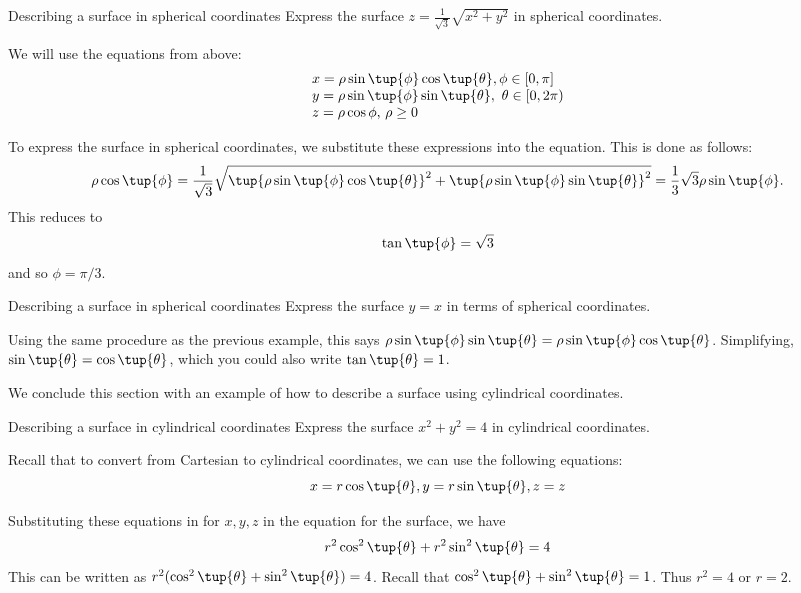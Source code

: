 \begin{example}{Describing a surface in spherical coordinates}{}
Express the surface $z=\frac{1}{\sqrt{3}}\sqrt{x^{2}+y^{2}}$ in spherical
coordinates.
\end{example}

\begin{solution}
We will use the equations from above:
\[
\begin{array}{l}
x =\rho \sin \tup{\phi } \cos \tup{\theta }, \phi \in 
\left[ 0,\pi \right]\\
 y =\rho \sin \tup{\phi } \sin \tup{\theta } ,\text{ }\theta
\in \lbrack 0,2\pi ) \\
 z =\rho \cos \phi \text{, }\rho \geq 0
\end{array}
\]

To express the surface in spherical coordinates, we substitute these expressions into the equation.  
This is done as follows:
\begin{equation*}
\rho \cos \tup{\phi } =\frac{1}{\sqrt{3}}\sqrt{\tup{\rho \sin
\tup{\phi } \cos \tup{\theta } } ^{2}+\tup{\rho \sin
\tup{\phi } \sin \tup{\theta } } ^{2}}=\allowbreak 
\frac{1}{3}\sqrt{3}\rho \sin \tup{\phi }.
\end{equation*}
This reduces to 
\begin{equation*}
\tan \tup{\phi }=\sqrt{3}
\end{equation*}
and so $\phi =\pi /3$.
\end{solution}

\begin{example}{Describing a surface in spherical coordinates}{}
Express the surface $y=x$ in terms of spherical coordinates.
\end{example}

\begin{solution}
Using the same procedure as the previous example, this says $\allowbreak \rho \sin \tup{\phi } \sin \tup{\theta
} =\rho \sin \tup{\phi } \cos \tup{\theta }$. Simplifying,  $\sin \tup{\theta } =\cos \tup{\theta }$, which you could also write $\tan \tup{\theta }=1$.
\end{solution}

We conclude this section with an example of how to describe a surface using cylindrical coordinates. 

\begin{example}{Describing a surface in cylindrical coordinates}{}
Express the surface $x^{2}+y^{2}=4$ in cylindrical coordinates.
\end{example}

\begin{solution}
Recall that to convert from Cartesian to cylindrical coordinates, we can use the following equations:
\[
x =r\cos \tup{\theta } , y=r\sin \tup{\theta } , z =z
\]

Substituting these equations in for $x,y,z$ in the equation for the surface, we have  
\[
r^{2}\cos ^{2} \tup{\theta } +r^{2}\sin ^{2} \tup{\theta }=4
\]
This can be written as $r^2 ( \cos^{2} \tup{\theta }+ \sin^{2} \tup{\theta} ) = 4$. Recall that $ \cos^{2} \tup{\theta }+ \sin^{2} \tup{\theta }=1$.  Thus $r^{2} = 4$ or $r=2$.
\end{solution}
